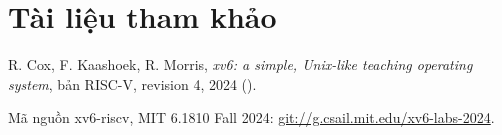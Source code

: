 \section*{Tài liệu tham khảo}
\begin{enumerate}[{[}1{]}]
  \item R. Cox, F. Kaashoek, R. Morris, \textit{xv6: a simple, Unix-like teaching
        operating system}, bản RISC-V, revision 4, 2024
        ().
  \item Mã nguồn xv6-riscv, MIT 6.1810 Fall 2024:
        \url{git://g.csail.mit.edu/xv6-labs-2024}.
\end{enumerate}
